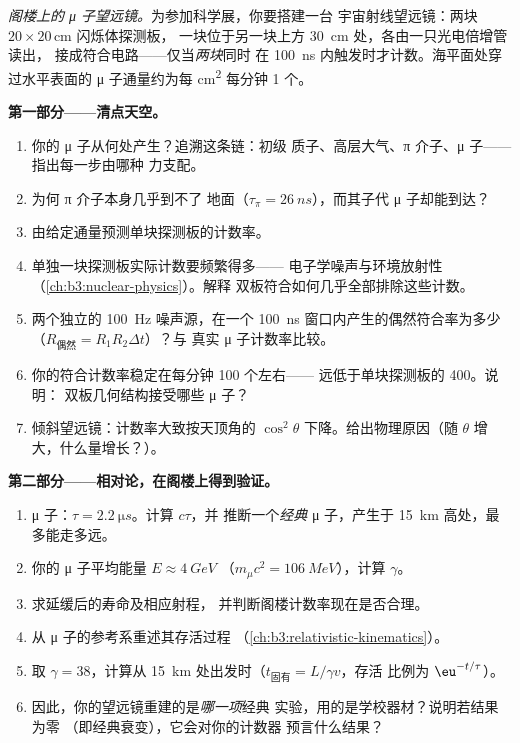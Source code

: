 \begin{problem}\label{pb:b3:particle-physics:1}
\emph{阁楼上的 μ 子望远镜。}为参加科学展，你要搭建一台
宇宙射线望远镜：两块 $20\times20$\,\unit{cm} 闪烁体探测板，
一块位于另一块上方 \qty{30}{cm} 处，各由一只光电倍增管读出，
接成符合电路——仅当\emph{两块}同时
在 \qty{100}{ns} 内触发时才计数。海平面处穿过水平表面的
μ 子通量约为每 \unit{cm^2} 每分钟 1 个。

\medskip\noindent\textbf{第一部分——清点天空。}

\begin{enumerate}
  \item 你的 μ 子从何处产生？追溯这条链：初级
        质子、高层大气、π 介子、μ 子——指出每一步由哪种
        力支配。
  \item 为何 π 介子本身几乎到不了
        地面（$\tau_\pi = \qty{26}{ns}$），而其子代
        μ 子却能到达？
  \item 由给定通量预测单块探测板的计数率。
  \item 单独一块探测板实际计数要频繁得多——
        电子学噪声与环境放射性
        （\cref{ch:b3:nuclear-physics}）。解释
        双板符合如何几乎全部排除这些计数。
  \item 两个独立的 \qty{100}{Hz} 噪声源，在一个
        \qty{100}{ns} 窗口内产生的偶然符合率为多少
        （$R_{\text{偶然}} = R_1R_2\Delta t$）？与
        真实 μ 子计数率比较。
  \item 你的符合计数率稳定在每分钟 100 个左右——
        远低于单块探测板的 400。说明：
        双板几何结构接受哪些 μ 子？
  \item 倾斜望远镜：计数率大致按天顶角的
        $\cos^2\theta$ 下降。给出物理原因（随
        $\theta$ 增大，什么量增长？）。
\end{enumerate}

\medskip\noindent\textbf{第二部分——相对论，在阁楼上得到验证。}

\begin{enumerate}[resume]
  \item μ 子：$\tau = \qty{2.2}{\micro s}$。计算 $c\tau$，并
        推断一个\emph{经典} μ 子，产生于
        \qty{15}{km} 高处，最多能走多远。
  \item 你的 μ 子平均能量 $E \approx \qty{4}{GeV}$
        （$m_\mu c^2 = \qty{106}{MeV}$），计算 $\gamma$。
  \item 求延缓后的寿命及相应射程，
        并判断阁楼计数率现在是否合理。
  \item 从 μ 子的参考系重述其存活过程
        （\cref{ch:b3:relativistic-kinematics}）。
  \item 取 $\gamma = 38$，计算从
        \qty{15}{km} 处出发时（$t_{\text{固有}} = L/\gamma v$，存活
        比例为 $\eu^{-t/\tau}$）。
  \item 因此，你的望远镜重建的是\emph{哪一项}经典
        实验，用的是学校器材？说明若结果为零
        （即经典衰变），它会对你的计数器
        预言什么结果？
\end{enumerate}


\end{problem}
